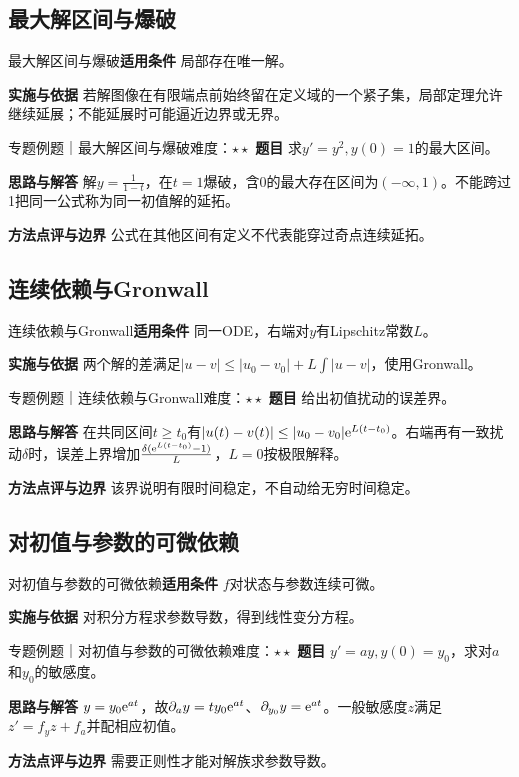 \subsection{最大解区间与爆破}\label{mat:ode_theory:extension}
\begin{method}{最大解区间与爆破}\textbf{适用条件} 局部存在唯一解。\par\textbf{实施与依据} 若解图像在有限端点前始终留在定义域的一个紧子集，局部定理允许继续延展；不能延展时可能逼近边界或无界。\end{method}
\begin{example}{专题例题｜最大解区间与爆破}{难度：$\star\star$}
\textbf{题目} 求$y\prime=y^2,y(0)=1$的最大区间。\par\textbf{思路与解答} 解$y=\frac{1}{1-t}$，在$t=1$爆破，含0的最大存在区间为$(-\infty,1)$。不能跨过1把同一公式称为同一初值解的延拓。\par\textbf{方法点评与边界} 公式在其他区间有定义不代表能穿过奇点连续延拓。
\end{example}
\subsection{连续依赖与Gronwall}\label{mat:ode_theory:dependence}
\begin{method}{连续依赖与Gronwall}\textbf{适用条件} 同一ODE，右端对$y$有Lipschitz常数$L$。\par\textbf{实施与依据} 两个解的差满足$|u-v|\le|u_0-v_0|+L\int|u-v|$，使用Gronwall。\end{method}
\begin{example}{专题例题｜连续依赖与Gronwall}{难度：$\star\star$}
\textbf{题目} 给出初值扰动的误差界。\par\textbf{思路与解答} 在共同区间$t\ge t_0$有$|u(t)-v(t)|\le|u_0-v_0|\mathrm{e}^{L(t-t_0)}$。右端再有一致扰动$\delta$时，误差上界增加$\frac{\delta(\mathrm{e}^{L(t-t_0)}-1)}{L}$，$L=0$按极限解释。\par\textbf{方法点评与边界} 该界说明有限时间稳定，不自动给无穷时间稳定。
\end{example}
\subsection{对初值与参数的可微依赖}\label{mat:ode_theory:variation}
\begin{method}{对初值与参数的可微依赖}\textbf{适用条件} $f$对状态与参数连续可微。\par\textbf{实施与依据} 对积分方程求参数导数，得到线性变分方程。\end{method}
\begin{example}{专题例题｜对初值与参数的可微依赖}{难度：$\star\star$}
\textbf{题目} $y\prime=ay,y(0)=y_0$，求对$a$和$y_0$的敏感度。\par\textbf{思路与解答} $y=y_0\mathrm{e}^{at}$，故$\partial_a y=t y_0\mathrm{e}^{at}$、$\partial_{y_0}y=\mathrm{e}^{at}$。一般敏感度$z$满足$z\prime=f_yz+f_a$并配相应初值。\par\textbf{方法点评与边界} 需要正则性才能对解族求参数导数。
\end{example}
